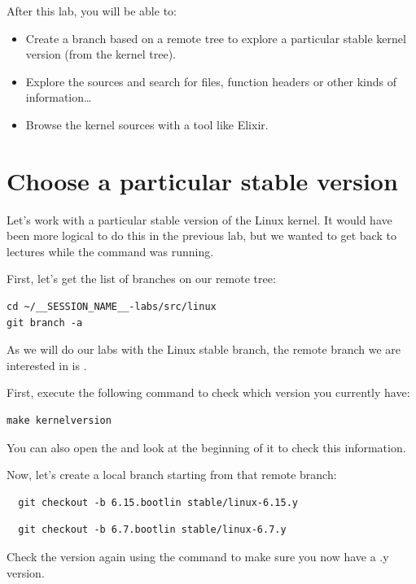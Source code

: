 
After this lab, you will be able to:

\begin{itemize}

\item Create a branch based on a remote tree to explore a particular
      stable kernel version (from the  kernel tree).
\item Explore the sources and search for files, function headers or
  other kinds of information\ldots
\item Browse the kernel sources with a tool like Elixir.
\end{itemize}

\section{Choose a particular stable version}

Let's work with a particular stable version of the Linux kernel.
It would have been more logical to do this in the previous lab, but we
wanted to get back to lectures while the  command was
running.

First, let's get the list of branches on our  remote tree:

\begin{verbatim}
cd ~/__SESSION_NAME__-labs/src/linux
git branch -a
\end{verbatim}

As we will do our labs with the Linux \workingkernel stable branch, the remote branch
we are interested in is .

First, execute the following command to check which version you
currently have:

\begin{verbatim}
make kernelversion
\end{verbatim}

You can also open the  and look at the beginning of it
to check this information.

Now, let's create a local branch starting from that remote branch:
\if{}
{
  \begin{verbatim}
  git checkout -b 6.15.bootlin stable/linux-6.15.y
  \end{verbatim}
}
\else
{
  \begin{verbatim}
  git checkout -b 6.7.bootlin stable/linux-6.7.y
  \end{verbatim}
}
\fi
Check the version again using the  command
to make sure you now have a \workingkernel.y version.

